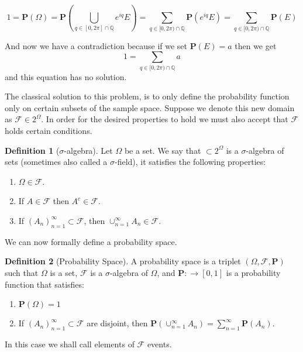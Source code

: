 \documentclass[11pt,a4paper]{article}
\theoremstyle{definition}
\newtheorem{definition}{Definition}[section]
\theoremstyle{plain}
\newcommand{\Q}{\mathbb{Q}}
\begin{document}
  \[
    1 = \mathbf P(\Omega) = 
    \mathbf P\left(\bigcup_{q \in [0,2\pi] \cap \Q}{e^{i q} E}\right) = 
    \sum_{q \in [0,2\pi) \cap \Q}{\mathbf P(e^{i q} E)} = 
    \sum_{q \in [0,2\pi) \cap \Q}{\mathbf P(E)}
  \]

  And now we have a contradiction because if we set $\mathbf P(E) = a$ then
  we get
  \[ 1 = \sum_{q \in [0,2\pi) \cap \Q}{a} \]
  and this equation has no solution.

  The classical solution to this problem, is to only define the probability
  function only on certain subsets of the sample space. Suppose we denote
  this new domain as $\mathcal F \in 2^\Omega$. In order for the desired
  properties to hold we must also accept that $\mathcal F$ holds certain
  conditions.

  \begin{definition}[$\sigma$-algebra]
    Let $\Omega$ be a set. We say that $\mathcal \subset 2^\Omega$ is a
    $\sigma$-algebra of sets (sometimes also called a $\sigma$-field), it
    satisfies the following properties:
    \begin{enumerate}
      \item $\Omega \in \mathcal F$.
      \item If $A \in \mathcal F$ then $A^c \in \mathcal F$.
      \item If $(A_n)_{n=1}^{\infty} \subset \mathcal F$, then
        $\cup_{n=1}^{\infty}{A_n} \in \mathcal F$.
    \end{enumerate}
  \end{definition}

  We can now formally define a probability space.

  \begin{definition}[Probability Space]
    A probability space is a triplet $(\Omega, \mathcal F, \mathbf P)$ such
    that $\Omega$ is a set, $\mathcal F$ is a $\sigma$-algebra of $\Omega$,
    and $\mathbf P \colon \mathcal \to [0,1]$ is a probability function that
    satisfies:
    \begin{enumerate}
      \item $\mathbf P(\Omega) = 1$
      \item If $(A_n)_{n=1}^{\infty} \subset \mathcal F$ are disjoint, then
        $\mathbf P\left(\cup_{n=1}^{\infty}{A_n}\right) = 
        \sum_{n=1}^{\infty}{\mathbf P(A_n)}$.
    \end{enumerate}
  \end{definition}

  In this case we shall call elements of $\mathcal F$ events.
\end{document}
